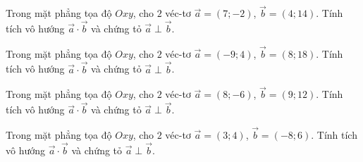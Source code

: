 \begin{bt}%
Trong mặt phẳng tọa độ $Oxy$, cho $2$ véc-tơ $\overrightarrow{a}=(7;-2)$, $\overrightarrow{b}=(4;14)$. Tính tích vô hướng $\overrightarrow{a}\cdot \overrightarrow{b}$ và chứng tỏ $\overrightarrow{a}\perp\overrightarrow{b}$.
\end{bt}

\begin{bt}%
Trong mặt phẳng tọa độ $Oxy$, cho $2$ véc-tơ $\overrightarrow{a}=(-9;4)$, $\overrightarrow{b}=(8;18)$. Tính tích vô hướng $\overrightarrow{a}\cdot \overrightarrow{b}$ và chứng tỏ $\overrightarrow{a}\perp\overrightarrow{b}$.
\end{bt}

\begin{bt}%
	Trong mặt phẳng tọa độ $Oxy$, cho $2$ véc-tơ $\overrightarrow{a}=(8;-6)$, $\overrightarrow{b}=(9;12)$. Tính tích vô hướng $\overrightarrow{a}\cdot \overrightarrow{b}$ và chứng tỏ $\overrightarrow{a}\perp\overrightarrow{b}$.
\end{bt}

\begin{bt}%
Trong mặt phẳng tọa độ $Oxy$, cho $2$ véc-tơ $\overrightarrow{a}=(3;4)$, $\overrightarrow{b}=(-8;6)$. Tính tích vô hướng $\overrightarrow{a}\cdot \overrightarrow{b}$ và chứng tỏ $\overrightarrow{a}\perp\overrightarrow{b}$.
\end{bt}


